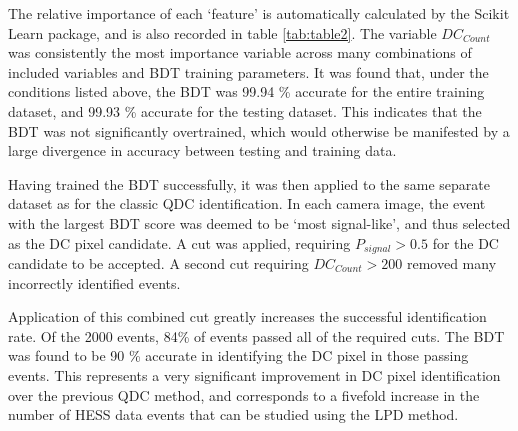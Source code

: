 \documentclass[]{article}
\begin{document}
The relative importance of each \textquoteleft feature' is automatically calculated by the Scikit Learn package, and is also recorded in table \ref{tab:table2}. The variable $DC_{Count}$ was consistently the most importance variable across many combinations of included variables and BDT training parameters. It was found that, under the conditions listed above, the BDT was 99.94 \% accurate for the entire training dataset, and 99.93 \%  accurate for the testing dataset. This indicates that the BDT was not significantly overtrained, which would otherwise be manifested by a large divergence in accuracy between testing and training data.

Having trained the BDT successfully, it was then applied to the same separate dataset as for the classic QDC identification. In each camera image, the event with the largest BDT score was deemed to be \textquoteleft most signal-like', and thus selected as the DC pixel candidate. A cut was applied, requiring $P_{signal} > 0.5$ for the DC candidate to be accepted. A second cut requiring $DC_{Count} > 200$ removed many incorrectly identified events. 

Application of this combined cut greatly increases the successful identification rate. Of the 2000 events, 84\% of events passed all of the required cuts. The BDT was found to be 90 \% accurate in identifying the DC pixel in those passing events. This represents a very significant improvement in DC pixel identification over the previous QDC method, and corresponds to a fivefold increase in the number of HESS data events that can be studied using the LPD method.
\end{document}
